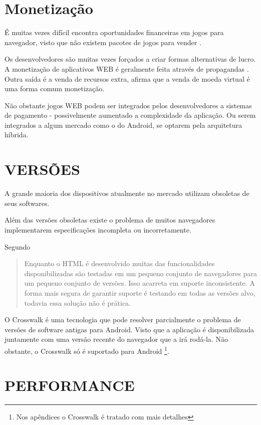 \section{Monetização}

É muitas vezes difícil encontra oportunidades financeiras em jogos
para navegador, visto que não existem pacotes de jogos para vender
\autocite[pp. 44]{gameCommunities}.

Os desenvolvedores são muitas vezes forçados a criar formas alternativas
de lucro. A monetização de aplicativos WEB é geralmente feita através de
propagandas \autocite[pp. 44]{gameCommunities}. Outra saída é a venda
de recursos extra, \cite[pp. 44]{gameCommunities} afirma
que a venda de moeda virtual é uma forma comum monetização.

Não obstante jogos WEB podem ser integrados pelos desenvolvedores
a sistemas de pagamento - possivelmente aumentado a complexidade da
aplicação. Ou serem integrados a algum mercado como o do Android, se
optarem pela arquitetura híbrida.

\section{VERSÕES}

A grande maioria dos dispositivos atualmente no mercado utilizam
obsoletas de seus softwares.

Além das versões obsoletas existe o problema de muitos navegadores 
implementarem especificações incompleta ou incorretamente.

Segundo \cite{crossPlatformMobileGame}
\begin{quote}
Enquanto o HTML é desenvolvido muitas das funcionalidades
disponibilizadas são testadas em um pequeno conjunto de navegadores
para um pequeno conjunto de versões. Isso acarreta em suporte
inconsistente. A forma mais segura de garantir suporte é testando em
todas as versões alvo, todavia essa solução não é prática.
\end{quote}

O Crosswalk é uma tecnologia que pode resolver parcialmente o problema
de versões de software antigas para Android. Visto que a aplicação
é disponibilizada juntamente com uma versão recente do navegador que
a irá rodá-la. Não obstante, o Crosswalk só é suportado
para Android \footnote{Nos apêndices o Crosswalk é tratado com mais
detalhes}.

\section{PERFORMANCE}

